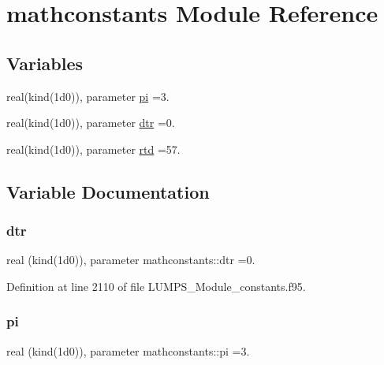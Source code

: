 \hypertarget{namespacemathconstants}{}\section{mathconstants Module Reference}
\label{namespacemathconstants}
\subsection*{Variables}
\begin{DoxyCompactItemize}
\item 
real(kind(1d0)), parameter \hyperlink{namespacemathconstants_a31c67c4b97732eec2768d395e451a82c}{pi} =3.
\item 
real(kind(1d0)), parameter \hyperlink{namespacemathconstants_a3260b589a8581f09677797307607cbbf}{dtr} =0.
\item 
real(kind(1d0)), parameter \hyperlink{namespacemathconstants_a9e7d0779306b0fa5ccd63d7c7fea37c0}{rtd} =57.
\end{DoxyCompactItemize}


\subsection{Variable Documentation}
\mbox{\label{namespacemathconstants_a3260b589a8581f09677797307607cbbf}} 
\subsubsection{\texorpdfstring{dtr}{dtr}}
{\footnotesize\ttfamily real (kind(1d0)), parameter mathconstants\+::dtr =0.}



Definition at line 2110 of file L\+U\+M\+P\+S\+\_\+\+Module\+\_\+constants.\+f95.

\mbox{\label{namespacemathconstants_a31c67c4b97732eec2768d395e451a82c}} 
\subsubsection{\texorpdfstring{pi}{pi}}
{\footnotesize\ttfamily real (kind(1d0)), parameter mathconstants\+::pi =3.}



